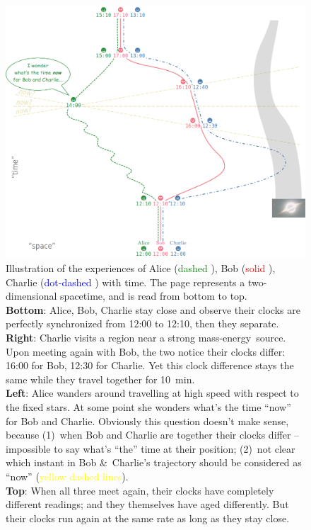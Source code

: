 \documentclass[a4paper,12pt,%
onecolumn,oneside,%
british%
]{memoir}
\newcommand*{\amp}{\&}
\renewcommand*{\|}[1][]{\nonscript\:#1\vert\nonscript\:\mathopen{}}
\newcommand*{\masse}{mass-energy}
\begin{document}
\begin{figure}[p]
  \includegraphics[width=\linewidth]{images/ABC_spacetime.png}
  \caption{Illustration of the experiences of Alice (\textcolor{green}{dashed }), Bob (\textcolor{red}{solid }), Charlie (\textcolor{blue}{dot-dashed }) with time. The page represents a two-dimensional spacetime, and is read from bottom to top.
\\[\jot]\textbf{Bottom}: Alice, Bob, Charlie stay close and observe their clocks are perfectly synchronized from 12:00 to 12:10, then they separate.
\\[\jot]\textbf{Right}: Charlie visits a region near a strong \masse\ source. Upon meeting again with Bob, the two notice their clocks differ: 16:00 for Bob, 12:30 for Charlie. Yet this clock difference stays the same while they travel together for \qty{10}{min}.
\\[\jot]\textbf{Left}: Alice wanders around travelling at high speed with respect to the fixed stars. At some point she wonders what's the time \enquote{now} for Bob and Charlie. Obviously this question doesn't make sense, because
(1)~when Bob and Charlie are together their clocks differ -- impossible to say what's \enquote{the} time at their position; (2)~not clear which instant in Bob \amp\ Charlie's trajectory should be considered as \enquote{now} (\textcolor{yellow}{yellow dashed lines}).
\\[\jot]\textbf{Top}: When all three meet again, their clocks have completely different readings; and they themselves have aged differently. But their clocks run again at the same rate as long as they stay close.}  \label{fig:ABC_spacetime}
\end{figure}
\end{document}
